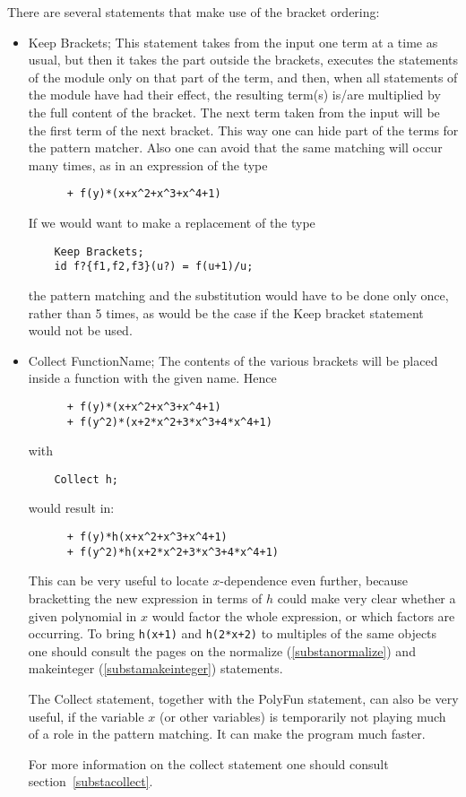 There are several statements that make use of the bracket ordering:
\begin{itemize}
\item Keep Brackets;
	This statement takes from the input one term at a time as usual, but 
then it takes the part outside the brackets, executes the statements of the 
module only on that part of the term, and then, when all statements of the 
module have had their effect, the resulting term(s) is/are multiplied by 
the full content of the bracket. The next term taken from the input will be 
the first term of the next bracket. This way one can hide part of the terms 
for the pattern matcher. Also one can avoid that the same matching will 
occur many times, as in an expression of the type
\begin{verbatim}
      + f(y)*(x+x^2+x^3+x^4+1)
\end{verbatim}
If we would want to make a replacement of the type
\begin{verbatim}
    Keep Brackets;
    id f?{f1,f2,f3}(u?) = f(u+1)/u;
\end{verbatim}
the pattern matching and the substitution would have to be done only once, 
rather than 5 times, as would be the case if the Keep bracket statement 
would not be used.
\item Collect FunctionName;
	The contents of the various brackets will be placed inside a function 
with the given name. Hence
\begin{verbatim}
      + f(y)*(x+x^2+x^3+x^4+1)
      + f(y^2)*(x+2*x^2+3*x^3+4*x^4+1)
\end{verbatim}
with
\begin{verbatim}
    Collect h;
\end{verbatim}
would result in:
\begin{verbatim}
      + f(y)*h(x+x^2+x^3+x^4+1)
      + f(y^2)*h(x+2*x^2+3*x^3+4*x^4+1)
\end{verbatim}
This can be very useful to locate $x$-dependence even further, because 
bracketting the new expression in terms of $h$ could make very clear 
whether a given polynomial in $x$ would factor the whole expression, or 
which factors are occurring. To bring \verb:h(x+1): and \verb:h(2*x+2): to 
multiples of the same objects one should consult the pages on the 
normalize 
(\ref{substanormalize}) 
and makeinteger (\ref{substamakeinteger}) statements.

The Collect statement, together with the PolyFun statement, 
can also be very useful, if the variable $x$ (or other variables) is 
temporarily not playing much of a role in the pattern matching. It can make 
the program much faster.

For more information on the collect statement one should consult 
section~\ref{substacollect}.
\end{itemize}

